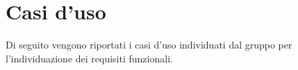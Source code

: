 \newcommand{\uc}{./UC/}
\section{Casi d'uso}{
	Di seguito vengono riportati i casi d'uso individuati dal gruppo per l'individuazione dei requisiti funzionali.
	
	\newpage
	
	\newpage
	
	\newpage
	
	\newpage
	
	\newpage
	
	\newpage
	
	\newpage
	
	\newpage
	
	\newpage
	
	\newpage
	
	\newpage
	
	\newpage
	
	\newpage
	
	\newpage
	
	\newpage
	
	\newpage
	
	\newpage
	
	}